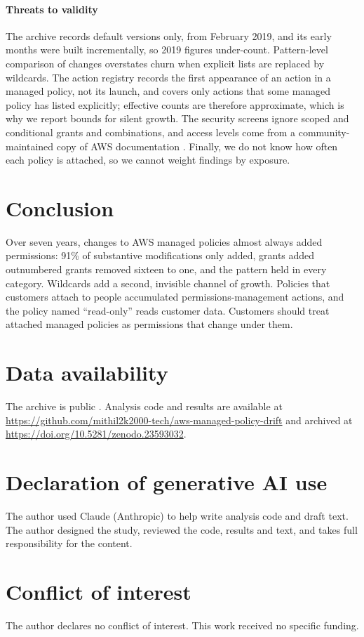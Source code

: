 \documentclass[journal]{IEEEtran}
\begin{document}
\paragraph*{Threats to validity}
The archive records default versions only, from February 2019, and its early months were built incrementally, so 2019 figures
under-count. Pattern-level comparison of changes overstates churn when explicit lists are replaced by wildcards. The action registry
records the first appearance of an action in a managed policy, not its launch, and covers only actions that some managed policy has
listed explicitly; effective counts are therefore approximate, which is why we report bounds for silent growth. The security screens
ignore scoped and conditional grants and combinations, and access levels come from a community-maintained copy of AWS documentation
\cite{iamdataset}. Finally, we do not know how often each policy is attached, so we cannot weight findings by exposure.

\section{Conclusion}
Over seven years, changes to AWS managed policies almost always added permissions: 91\% of substantive modifications only added, grants
added outnumbered grants removed sixteen to one, and the pattern held in every category. Wildcards add a second, invisible channel of
growth. Policies that customers attach to people accumulated permissions-management actions, and the policy named ``read-only'' reads
customer data. Customers should treat attached managed policies as permissions that change under them.

\section*{Data availability}
The archive is public \cite{mamip}. Analysis code and results are available at
\url{https://github.com/mithil2k2000-tech/aws-managed-policy-drift} and archived at \url{https://doi.org/10.5281/zenodo.23593032}.

\section*{Declaration of generative AI use}
The author used Claude (Anthropic) to help write analysis code and draft text. The author designed the study, reviewed the code, results
and text, and takes full responsibility for the content.

\section*{Conflict of interest}
The author declares no conflict of interest. This work received no specific funding.



\end{document}
